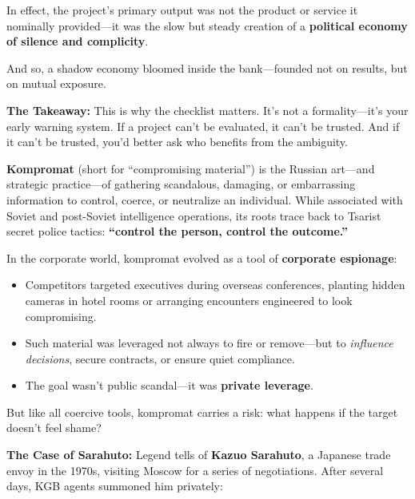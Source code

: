 \medskip

In effect, the project’s primary output was not the product or service it nominally provided—it was the slow but steady creation of a \textbf{political economy of silence and complicity}.

And so, a shadow economy bloomed inside the bank—founded not on results, but on mutual exposure.

\medskip

\textbf{The Takeaway:}  
This is why the checklist matters. It's not a formality—it’s your early warning system.  If a project can’t be evaluated, it can’t be trusted.  And if it can’t be trusted, you’d better ask who benefits from the ambiguity.

\begin{tcolorbox}[colback=blue!5!white, colframe=blue!50!black, breakable, title={Historical Sidebar: Kompromat --- When Blackmail Becomes the Business Model}]

  \textbf{Kompromat} (short for “compromising material”) is the Russian art—and strategic practice—of gathering scandalous, damaging, or embarrassing information to control, coerce, or neutralize an individual.  
  While associated with Soviet and post-Soviet intelligence operations, its roots trace back to Tsarist secret police tactics: \textbf{“control the person, control the outcome.”}
  
  \medskip
  
  In the corporate world, kompromat evolved as a tool of \textbf{corporate espionage}:  
  \begin{itemize}
      \item Competitors targeted executives during overseas conferences, planting hidden cameras in hotel rooms or arranging encounters engineered to look compromising.
      \item Such material was leveraged not always to fire or remove—but to \emph{influence decisions}, secure contracts, or ensure quiet compliance.
      \item The goal wasn’t public scandal—it was \textbf{private leverage}.
  \end{itemize}
  
  \medskip
  
  But like all coercive tools, kompromat carries a risk: what happens if the target doesn’t feel shame?
  
  \medskip
  
  \textbf{The Case of Sarahuto:}  
  Legend tells of \textbf{Kazuo Sarahuto}, a Japanese trade envoy in the 1970s, visiting Moscow for a series of negotiations.  
  After several days, KGB agents summoned him privately:
  

\end{tcolorbox}
